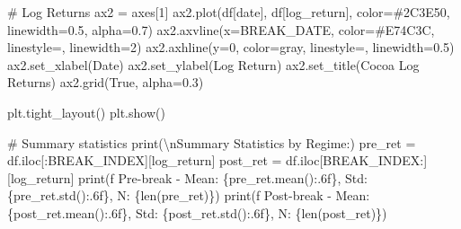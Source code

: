 \documentclass[
  letterpaper,
  DIV=11,
  numbers=noendperiod]{scrartcl}
\newenvironment{Shaded}{\begin{snugshade}}{\end{snugshade}}
\newcommand{\BuiltInTok}[1]{\textcolor[rgb]{0.00,0.23,0.31}{#1}}
\newcommand{\CharTok}[1]{\textcolor[rgb]{0.13,0.47,0.30}{#1}}
\newcommand{\CommentTok}[1]{\textcolor[rgb]{0.37,0.37,0.37}{#1}}
\newcommand{\DecValTok}[1]{\textcolor[rgb]{0.68,0.00,0.00}{#1}}
\newcommand{\FloatTok}[1]{\textcolor[rgb]{0.68,0.00,0.00}{#1}}
\newcommand{\NormalTok}[1]{\textcolor[rgb]{0.00,0.23,0.31}{#1}}
\newcommand{\OperatorTok}[1]{\textcolor[rgb]{0.37,0.37,0.37}{#1}}
\newcommand{\SpecialCharTok}[1]{\textcolor[rgb]{0.37,0.37,0.37}{#1}}
\newcommand{\SpecialStringTok}[1]{\textcolor[rgb]{0.13,0.47,0.30}{#1}}
\newcommand{\StringTok}[1]{\textcolor[rgb]{0.13,0.47,0.30}{#1}}
\newcommand{\VariableTok}[1]{\textcolor[rgb]{0.07,0.07,0.07}{#1}}
\begin{document}
\begin{Shaded}
\begin{Highlighting}[]
\CommentTok{\# Log Returns}
\NormalTok{ax2 }\OperatorTok{=}\NormalTok{ axes[}\DecValTok{1}\NormalTok{]}
\NormalTok{ax2.plot(df[}\StringTok{\textquotesingle{}date\textquotesingle{}}\NormalTok{], df[}\StringTok{\textquotesingle{}log\_return\textquotesingle{}}\NormalTok{], color}\OperatorTok{=}\StringTok{\textquotesingle{}\#2C3E50\textquotesingle{}}\NormalTok{, linewidth}\OperatorTok{=}\FloatTok{0.5}\NormalTok{, alpha}\OperatorTok{=}\FloatTok{0.7}\NormalTok{)}
\NormalTok{ax2.axvline(x}\OperatorTok{=}\NormalTok{BREAK\_DATE, color}\OperatorTok{=}\StringTok{\textquotesingle{}\#E74C3C\textquotesingle{}}\NormalTok{, linestyle}\OperatorTok{=}\StringTok{\textquotesingle{}{-}{-}\textquotesingle{}}\NormalTok{, linewidth}\OperatorTok{=}\DecValTok{2}\NormalTok{)}
\NormalTok{ax2.axhline(y}\OperatorTok{=}\DecValTok{0}\NormalTok{, color}\OperatorTok{=}\StringTok{\textquotesingle{}gray\textquotesingle{}}\NormalTok{, linestyle}\OperatorTok{=}\StringTok{\textquotesingle{}{-}\textquotesingle{}}\NormalTok{, linewidth}\OperatorTok{=}\FloatTok{0.5}\NormalTok{)}
\NormalTok{ax2.set\_xlabel(}\StringTok{\textquotesingle{}Date\textquotesingle{}}\NormalTok{)}
\NormalTok{ax2.set\_ylabel(}\StringTok{\textquotesingle{}Log Return\textquotesingle{}}\NormalTok{)}
\NormalTok{ax2.set\_title(}\StringTok{\textquotesingle{}Cocoa Log Returns\textquotesingle{}}\NormalTok{)}
\NormalTok{ax2.grid(}\VariableTok{True}\NormalTok{, alpha}\OperatorTok{=}\FloatTok{0.3}\NormalTok{)}

\NormalTok{plt.tight\_layout()}
\NormalTok{plt.show()}

\CommentTok{\# Summary statistics}
\BuiltInTok{print}\NormalTok{(}\StringTok{\textquotesingle{}}\CharTok{\textbackslash{}n}\StringTok{Summary Statistics by Regime:\textquotesingle{}}\NormalTok{)}
\NormalTok{pre\_ret }\OperatorTok{=}\NormalTok{ df.iloc[:BREAK\_INDEX][}\StringTok{\textquotesingle{}log\_return\textquotesingle{}}\NormalTok{]}
\NormalTok{post\_ret }\OperatorTok{=}\NormalTok{ df.iloc[BREAK\_INDEX:][}\StringTok{\textquotesingle{}log\_return\textquotesingle{}}\NormalTok{]}
\BuiltInTok{print}\NormalTok{(}\SpecialStringTok{f\textquotesingle{}  Pre{-}break  {-} Mean: }\SpecialCharTok{\{}\NormalTok{pre\_ret}\SpecialCharTok{.}\NormalTok{mean()}\SpecialCharTok{:.6f\}}\SpecialStringTok{, Std: }\SpecialCharTok{\{}\NormalTok{pre\_ret}\SpecialCharTok{.}\NormalTok{std()}\SpecialCharTok{:.6f\}}\SpecialStringTok{, N: }\SpecialCharTok{\{}\BuiltInTok{len}\NormalTok{(pre\_ret)}\SpecialCharTok{\}}\SpecialStringTok{\textquotesingle{}}\NormalTok{)}
\BuiltInTok{print}\NormalTok{(}\SpecialStringTok{f\textquotesingle{}  Post{-}break {-} Mean: }\SpecialCharTok{\{}\NormalTok{post\_ret}\SpecialCharTok{.}\NormalTok{mean()}\SpecialCharTok{:.6f\}}\SpecialStringTok{, Std: }\SpecialCharTok{\{}\NormalTok{post\_ret}\SpecialCharTok{.}\NormalTok{std()}\SpecialCharTok{:.6f\}}\SpecialStringTok{, N: }\SpecialCharTok{\{}\BuiltInTok{len}\NormalTok{(post\_ret)}\SpecialCharTok{\}}\SpecialStringTok{\textquotesingle{}}\NormalTok{)}
\end{Highlighting}
\end{Shaded}
\end{document}
